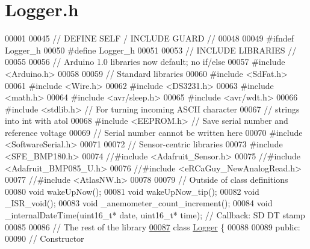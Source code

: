 \hypertarget{Logger_8h_source}{}\section{Logger.\+h}

\begin{DoxyCode}
00001 
00045 \textcolor{comment}{// DEFINE SELF / INCLUDE GUARD //}
00048 \textcolor{comment}{}
00049 \textcolor{preprocessor}{#ifndef Logger\_h}
00050 \textcolor{preprocessor}{#define Logger\_h}
00051 
00053 \textcolor{comment}{// INCLUDE LIBRARIES //}
00055 \textcolor{comment}{}
00056 \textcolor{comment}{// Arduino 1.0 libraries now default; no if/else}
00057 \textcolor{preprocessor}{#include <Arduino.h>}
00058 
00059 \textcolor{comment}{// Standard libraries}
00060 \textcolor{preprocessor}{#include <SdFat.h>}
00061 \textcolor{preprocessor}{#include <Wire.h>}
00062 \textcolor{preprocessor}{#include <DS3231.h>}
00063 \textcolor{preprocessor}{#include <math.h>}
00064 \textcolor{preprocessor}{#include <avr/sleep.h>}
00065 \textcolor{preprocessor}{#include <avr/wdt.h>}
00066 \textcolor{preprocessor}{#include <stdlib.h>} \textcolor{comment}{// For turning incoming ASCII character}
00067                     \textcolor{comment}{// strings into int with atol}
00068 \textcolor{preprocessor}{#include <EEPROM.h>} \textcolor{comment}{// Save serial number and reference voltage}
00069                     \textcolor{comment}{// Serial number cannot be written here}
00070 \textcolor{preprocessor}{#include <SoftwareSerial.h>}
00071 
00072 \textcolor{comment}{// Sensor-centric libraries}
00073 \textcolor{preprocessor}{#include <SFE\_BMP180.h>}
00074 \textcolor{comment}{//#include <Adafruit\_Sensor.h>}
00075 \textcolor{comment}{//#include <Adafruit\_BMP085\_U.h>}
00076 \textcolor{comment}{//#include <eRCaGuy\_NewAnalogRead.h>}
00077 \textcolor{comment}{//#include <AtlasNW.h>}
00078 
00079 \textcolor{comment}{// Outside of class definitions}
00080 \textcolor{keywordtype}{void} wakeUpNow();
00081 \textcolor{keywordtype}{void} wakeUpNow\_tip();
00082 \textcolor{keywordtype}{void} \_ISR\_void();
00083 \textcolor{keywordtype}{void} \_anemometer\_count\_increment();
00084 \textcolor{keywordtype}{void} \_internalDateTime(uint16\_t* date, uint16\_t* time); \textcolor{comment}{// Callback: SD DT stamp}
00085 
00086 \textcolor{comment}{// The rest of the library}
\hyperlink{classLogger}{00087} \textcolor{keyword}{class }\hyperlink{classLogger}{Logger} \{
00088 
00089   \textcolor{keyword}{public}:
00090     \textcolor{comment}{// Constructor}

\end{DoxyCode}
